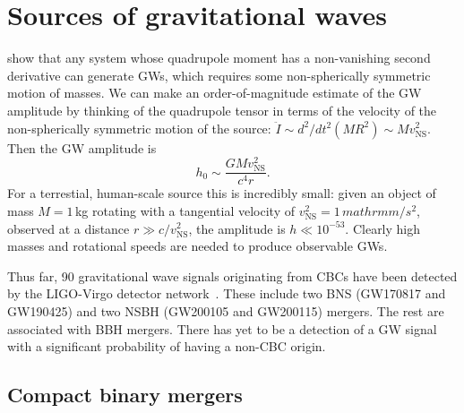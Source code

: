 \section{Sources of gravitational waves}\label{sec:gw-sources}

 show that any system whose quadrupole moment has a non-vanishing second derivative can generate \acp{GW}, which requires some non-spherically symmetric motion of masses.
We can make an order-of-magnitude estimate of the GW amplitude by thinking of the quadrupole tensor in terms of the velocity of the non-spherically symmetric motion of the source: $\ddot{I} \sim d^2/dt^2 (M R^2) \sim M v_{\textrm{NS}}^2$.
Then the GW amplitude is
\begin{equation}
	h_0 \sim \frac{GM v_{\textrm{NS}}^2}{c^4 r}.
\end{equation}
For a terrestial, human-scale source this is incredibly small: given an object of mass $M=1$\,kg rotating with a tangential velocity of $v_{\textrm{NS}}^2=1\,mathrm{m/s^2}$, observed at a distance $r \gg c/v_{\textrm{NS}}^2$, the amplitude is $h \ll 10^{-53}$.
Clearly high masses and rotational speeds are needed to produce observable GWs.

Thus far, 90 gravitational wave signals originating from \acp{CBC} have been detected by the LIGO-Virgo detector network~\citep{gwtc3}. These include two \ac{BNS} (GW170817 and GW190425) and two \ac{NSBH} (GW200105 and GW200115) mergers. The rest are associated with \ac{BBH} mergers. There has yet to be a detection of a \ac{GW} signal with a significant probability of having a non-\ac{CBC} origin.


\subsection{Compact binary mergers}


